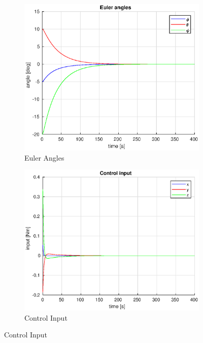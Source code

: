 \begin{figure}[h]
    \centering
    \begin{subfigure}[b]{0.45\textwidth}
        \includegraphics[width=\textwidth]{plots/euler_angles_13.eps}
        \caption{Euler Angles}
        \label{fig:euler}
    \end{subfigure}
    \begin{subfigure}[b]{0.45\textwidth}
        \includegraphics[width=\textwidth]{plots/control_input_13.eps}
        \caption{Control Input}
        \label{fig:input}
    \end{subfigure}

\end{figure}
